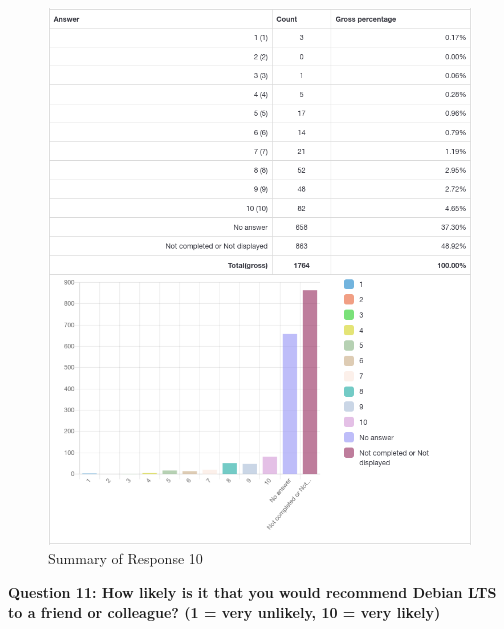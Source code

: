 \documentclass{article}
\begin{document}
\vspace{3mm}
\begin{figure}[h!]
\centering
\includegraphics[width=16.3cm]{assets/10-summary.png}
\caption{Summary of Response 10}
\end{figure}

\newpage

\Large{\textbf{Question 11: How likely is it that you would recommend Debian LTS to a friend or colleague? (1 = very unlikely, 10 = very likely)}}
\end{document}

